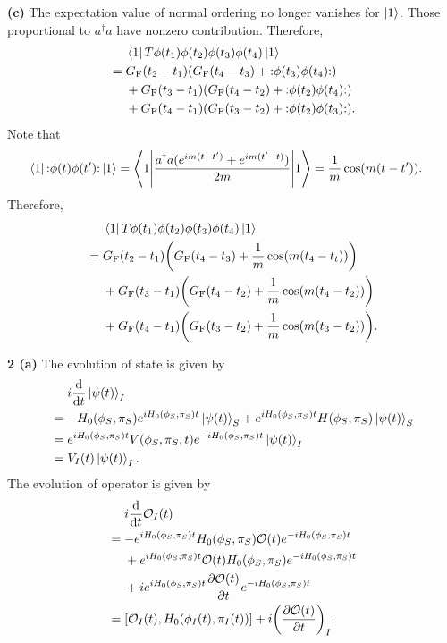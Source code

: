\documentclass{article}
\makeatletter
\newcommand*{\shifttext}[1]{%
  \settowidth{\@tempdima}{#1}%
  \hspace{-\@tempdima}#1%
}
\newcommand{\plabel}[1]{%
\shifttext{\textbf{#1}\quad}%
}
\newcommand{\prule}{%
\begin{center}%
\hdashrule[0.5ex]{.99\linewidth}{1pt}{1pt 2.5pt}%
\end{center}%
}
\makeatother
\begin{document}
\plabel{(c)}%
The expectation value of normal ordering no longer vanishes for $\ket{1}$.
Those proportional to $a^\dagger a$ have nonzero contribution.
Therefore,
\begin{align*}
    &\phantom{{}={}} \bra{1} T\phi(t_1) \phi(t_2) \phi(t_3) \phi(t_4)\ket{1} \\
    &= G_{\mathrm{F}}(t_2 - t_1) \qty(G_{\mathrm{F}}(t_4 - t_3) + \normord{\phi(t_3)\phi(t_4)}) \\
    &\phantom{{}={}} {} + G_{\mathrm{F}}(t_3 - t_1) \qty(G_{\mathrm{F}}(t_4 - t_2) + \normord{\phi(t_2)\phi(t_4)}) \\
    &\phantom{{}={}} {} + G_{\mathrm{F}}(t_4 - t_1) \qty(G_{\mathrm{F}}(t_3 - t_2) + \normord{\phi(t_2)\phi(t_3)}).
\end{align*}
Note that
\begin{align*}
    \bra{1} \normord{\phi(t)\phi(t')} \ket{1} &= \ev**{\frac{a^\dagger a (e^{im(t-t')} + e^{im(t'-t)})}{2m}}{1} = \frac{1}{m} \cos(m(t-t')).
\end{align*}
Therefore,
\begin{align*}
    &\phantom{{}={}} \bra{1} T\phi(t_1) \phi(t_2) \phi(t_3) \phi(t_4)\ket{1} \\
    &= G_{\mathrm{F}}(t_2 - t_1) \qty(G_{\mathrm{F}}(t_4 - t_3) + \frac{1}{m} \cos(m(t_4-t_t))) \\
    &\phantom{{}={}} {} + G_{\mathrm{F}}(t_3 - t_1) \qty(G_{\mathrm{F}}(t_4 - t_2) + \frac{1}{m} \cos(m(t_4-t_2))) \\
    &\phantom{{}={}} {} + G_{\mathrm{F}}(t_4 - t_1) \qty(G_{\mathrm{F}}(t_3 - t_2) + \frac{1}{m} \cos(m(t_3-t_2))).
\end{align*}

\prule
\plabel{2 (a)}%
The evolution of state is given by
\begin{align}
    \notag &\phantom{{}={}} i\dv{}{t} \ket{\psi(t)}_I \\
    \notag &= -H_0(\phi_S,\pi_S) e^{iH_0(\phi_S,\pi_S) t}\ket{\psi(t)}_S + e^{iH_0(\phi_S,\pi_S) t} H(\phi_S,\pi_S) \ket{\psi(t)}_S \\
    \notag &= e^{iH_0(\phi_S,\pi_S) t} V(\phi_S,\pi_S,t) e^{-iH_0(\phi_S,\pi_S) t} \ket{\psi(t)}_I \\
    \label{eq:time_evolution_state} &= V_I(t) \ket{\psi(t)}_I.
\end{align}
The evolution of operator is given by
\begin{align*}
    &\phantom{{}={}} i\dv{}{t} \mathcal{O}_I(t) \\
    &= - e^{iH_0(\phi_S,\pi_S) t} H_0(\phi_S,\pi_S) \mathcal{O}(t) e^{-iH_0(\phi_S,\pi_S) t} \\
    &\phantom{{}={}} {} + e^{iH_0(\phi_S,\pi_S) t} \mathcal{O}(t) H_0(\phi_S,\pi_S) e^{-iH_0(\phi_S,\pi_S) t} \\
    &\phantom{{}={}} {} + ie^{iH_0(\phi_S,\pi_S) t} \pdv{\mathcal{O}(t)}{t} e^{-iH_0(\phi_S,\pi_S) t} \\
    &= [\mathcal{O}_I(t), H_0(\phi_I(t),\pi_I(t))] + i\qty(\pdv{\mathcal{O}(t)}{t})_I.
\end{align*}
\end{document}
